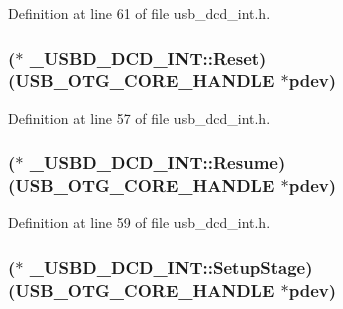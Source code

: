 Definition at line 61 of file usb\-\_\-dcd\-\_\-int.\-h.

\hypertarget{struct___u_s_b_d___d_c_d___i_n_t_a5e42047c29c5b178a42ab6cd455249ff}{
\subsubsection[{Reset}]{($\ast$  \-\_\-\-U\-S\-B\-D\-\_\-\-D\-C\-D\-\_\-\-I\-N\-T\-::\-Reset)({\bf U\-S\-B\-\_\-\-O\-T\-G\-\_\-\-C\-O\-R\-E\-\_\-\-H\-A\-N\-D\-L\-E} $\ast$pdev)}}\label{struct___u_s_b_d___d_c_d___i_n_t_a5e42047c29c5b178a42ab6cd455249ff}


Definition at line 57 of file usb\-\_\-dcd\-\_\-int.\-h.

\hypertarget{struct___u_s_b_d___d_c_d___i_n_t_a134087a55f3b8fb50c5f607b31daf737}{
\subsubsection[{Resume}]{($\ast$  \-\_\-\-U\-S\-B\-D\-\_\-\-D\-C\-D\-\_\-\-I\-N\-T\-::\-Resume)({\bf U\-S\-B\-\_\-\-O\-T\-G\-\_\-\-C\-O\-R\-E\-\_\-\-H\-A\-N\-D\-L\-E} $\ast$pdev)}}\label{struct___u_s_b_d___d_c_d___i_n_t_a134087a55f3b8fb50c5f607b31daf737}


Definition at line 59 of file usb\-\_\-dcd\-\_\-int.\-h.

\hypertarget{struct___u_s_b_d___d_c_d___i_n_t_ae5f8f12aa08a893032ba6cc9e55f2ffa}{
\subsubsection[{Setup\-Stage}]{($\ast$  \-\_\-\-U\-S\-B\-D\-\_\-\-D\-C\-D\-\_\-\-I\-N\-T\-::\-Setup\-Stage)({\bf U\-S\-B\-\_\-\-O\-T\-G\-\_\-\-C\-O\-R\-E\-\_\-\-H\-A\-N\-D\-L\-E} $\ast$pdev)}}\label{struct___u_s_b_d___d_c_d___i_n_t_ae5f8f12aa08a893032ba6cc9e55f2ffa}


